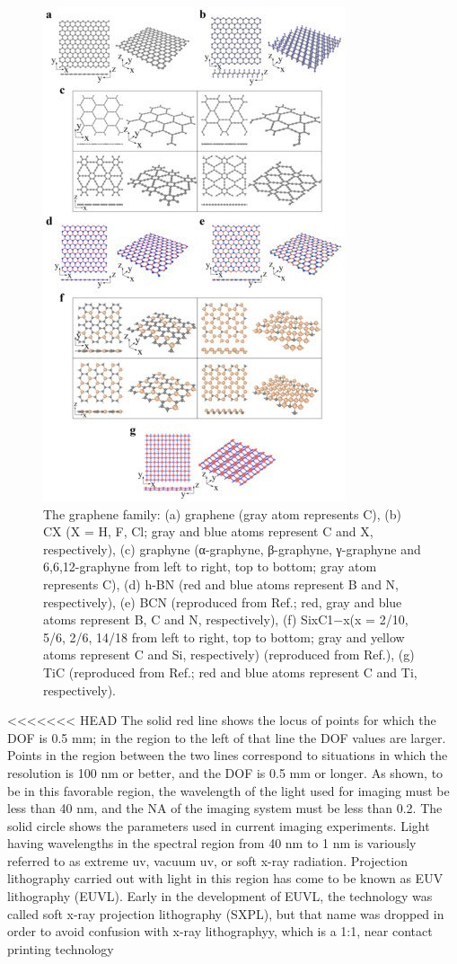 \documentclass[12pt,a4paper]{report}
\begin{document}
\begin{figure}
  \centering
  \includegraphics[scale=0.3]{2.1.jpg}
  \caption{The graphene family: (a) graphene (gray atom represents C), (b) CX (X = H, F, Cl; gray and blue atoms represent C and X, respectively), (c) graphyne (α-graphyne, β-graphyne, γ-graphyne and 6,6,12-graphyne from left to right, top to bottom; gray atom represents C), (d) h-BN (red and blue atoms represent B and N, respectively), (e) BCN (reproduced from Ref.; red, gray and blue atoms represent B, C and N, respectively), (f) SixC1−x(x = 2/10, 5/6, 2/6, 14/18 from left to right, top to bottom; gray and yellow atoms represent C and Si, respectively) (reproduced from Ref.), (g) TiC (reproduced from Ref.; red and blue atoms represent C and Ti, respectively).}
  \label{graphenefam}
  \end{figure}

<<<<<<< HEAD
  The solid red line shows the locus of points for which the
DOF is 0.5 mm; in the region to the left of that line the
DOF values are larger. Points in the region between the
two lines correspond to situations in which the resolution
is 100 nm or better, and the DOF is 0.5 mm or longer. As
shown, to be in this favorable region, the wavelength of
the light used for imaging must be less than 40 nm, and
the NA of the imaging system must be less than 0.2. The
solid circle shows the parameters used in current imaging
experiments. Light having wavelengths in the spectral
region from 40 nm to 1 nm is variously referred to as
extreme uv, vacuum uv, or soft x-ray radiation.
Projection lithography carried out with light in this
region has come to be known as EUV lithography
(EUVL). Early in the development of EUVL, the
technology was called soft x-ray projection lithography
(SXPL), but that name was dropped in order to avoid
confusion with x-ray lithographyy, which is a 1:1, 
near contact printing technology
\end{document}
